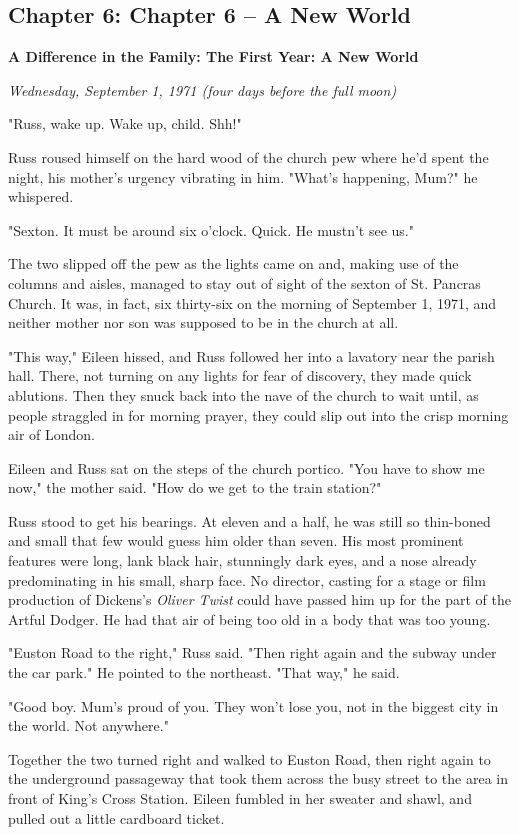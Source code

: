 \documentclass[a4paper,11pt]{article}
\begin{document}
\subsection{Chapter 6: Chapter 6 – A New World}

\textbf{A Difference in the Family: The First Year: A New World}

\emph{Wednesday, September 1, 1971 (four days before the full moon)}

"Russ, wake up. Wake up, child. Shh!"

Russ roused himself on the hard wood of the church pew where he'd spent the night, his mother's urgency vibrating in him. "What's happening, Mum?" he whispered.

"Sexton. It must be around six o'clock. Quick. He mustn't see us."

The two slipped off the pew as the lights came on and, making use of the columns and aisles, managed to stay out of sight of the sexton of St. Pancras Church. It was, in fact, six thirty-six on the morning of September 1, 1971, and neither mother nor son was supposed to be in the church at all.

"This way," Eileen hissed, and Russ followed her into a lavatory near the parish hall. There, not turning on any lights for fear of discovery, they made quick ablutions. Then they snuck back into the nave of the church to wait until, as people straggled in for morning prayer, they could slip out into the crisp morning air of London.

Eileen and Russ sat on the steps of the church portico. "You have to show me now," the mother said. "How do we get to the train station?"

Russ stood to get his bearings. At eleven and a half, he was still so thin-boned and small that few would guess him older than seven. His most prominent features were long, lank black hair, stunningly dark eyes, and a nose already predominating in his small, sharp face. No director, casting for a stage or film production of Dickens's \emph{Oliver Twist} could have passed him up for the part of the Artful Dodger. He had that air of being too old in a body that was too young.

"Euston Road to the right," Russ said. "Then right again and the subway under the car park." He pointed to the northeast. "That way," he said.

"Good boy. Mum's proud of you. They won't lose you, not in the biggest city in the world. Not anywhere."

Together the two turned right and walked to Euston Road, then right again to the underground passageway that took them across the busy street to the area in front of King's Cross Station. Eileen fumbled in her sweater and shawl, and pulled out a little cardboard ticket.
\end{document}
